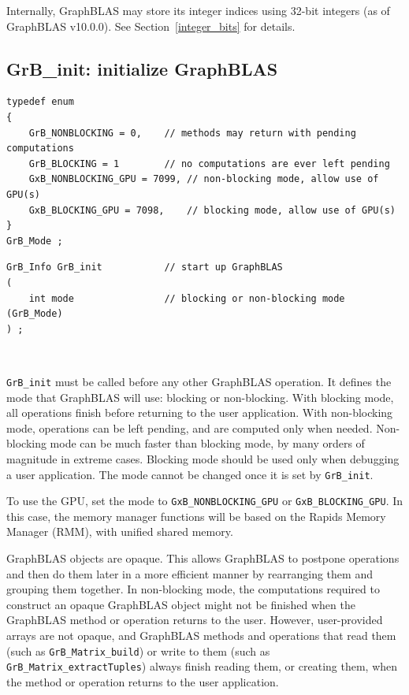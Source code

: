 Internally, GraphBLAS may store its integer indices using 32-bit integers
(as of GraphBLAS v10.0.0).  See Section~\ref{integer_bits} for details.

\subsection{{\sf GrB\_init:} initialize GraphBLAS} %
\label{init}

\begin{mdframed}[userdefinedwidth=6in]
{\footnotesize
\begin{verbatim}
typedef enum
{
    GrB_NONBLOCKING = 0,    // methods may return with pending computations
    GrB_BLOCKING = 1        // no computations are ever left pending
    GxB_NONBLOCKING_GPU = 7099, // non-blocking mode, allow use of GPU(s)
    GxB_BLOCKING_GPU = 7098,    // blocking mode, allow use of GPU(s)
}
GrB_Mode ;
\end{verbatim}
}\end{mdframed}

\begin{mdframed}[userdefinedwidth=6in]
{\footnotesize
\begin{verbatim}
GrB_Info GrB_init           // start up GraphBLAS
(
    int mode                // blocking or non-blocking mode (GrB_Mode)
) ;
\end{verbatim}
}\end{mdframed}

\hypertarget{link:init}{\mbox{ }}%
\verb'GrB_init' must be called before any other GraphBLAS operation.  It
defines the mode that GraphBLAS will use:  blocking or non-blocking.  With
blocking mode, all operations finish before returning to the user application.
With non-blocking mode, operations can be left pending, and are computed only
when needed.  Non-blocking mode can be much faster than blocking mode, by many
orders of magnitude in extreme cases.  Blocking mode should be used only when
debugging a user application.  The mode cannot be changed once it is set by
\verb'GrB_init'.

To use the GPU, set the mode to \verb'GxB_NONBLOCKING_GPU' or
\verb'GxB_BLOCKING_GPU'.  In this case, the memory manager functions will
be based on the Rapids Memory Manager (RMM), with unified shared memory.

GraphBLAS objects are opaque.  This allows GraphBLAS to
postpone operations and then do them later in a more efficient manner by
rearranging them and grouping them together.  In non-blocking mode, the
computations required to construct an opaque GraphBLAS object might not be
finished when the GraphBLAS method or operation returns to the user.  However,
user-provided arrays are not opaque, and GraphBLAS methods and operations that
read them (such as \verb'GrB_Matrix_build') or write to them (such as
\verb'GrB_Matrix_extractTuples') always finish reading them, or creating them,
when the method or operation returns to the user application.

